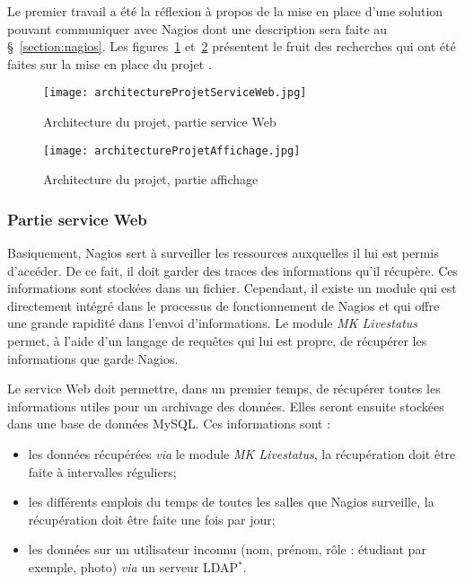 Le premier travail a \'et\'e la r\'eflexion \`a propos de la mise en place d'une solution pouvant communiquer avec Nagios dont une description sera faite au \S~\ref{section:nagios}.
Les figures~\ref{figure:architectureProjetServiceWeb} et~\ref{figure:architectureProjetAffichage} pr\'esentent le fruit des recherches qui ont \'et\'e faites sur la mise en place du projet \YuukouII.

\begin{figure}[!ht]
	\centering
	\texttt{[image: architectureProjetServiceWeb.jpg]}
	\caption{Architecture du projet, partie service Web}
	\label{figure:architectureProjetServiceWeb}

\end{figure}

\begin{figure}[!ht]
	\centering
	\texttt{[image: architectureProjetAffichage.jpg]}
	\caption{Architecture du projet, partie affichage}
	\label{figure:architectureProjetAffichage}

\end{figure}

\subsubsection{Partie service Web}

Basiquement, Nagios sert \`a surveiller les ressources auxquelles il lui est permis d'acc\'eder.
De ce fait, il doit garder des traces des informations qu'il r\'ecup\`ere.
Ces informations sont stock\'ees dans un fichier.
Cependant, il existe un module qui est directement int\'egr\'e dans le processus de fonctionnement de Nagios et qui offre une grande rapidit\'e dans l'envoi d'informations.
Le module \textit{MK Livestatus} permet, \`a l'aide d'un langage de requ\^etes qui lui est propre, de r\'ecup\'erer les informations que garde Nagios.

Le service Web doit permettre, dans un premier temps, de r\'ecup\'erer toutes les informations utiles pour un archivage des donn\'ees.
Elles seront ensuite stock\'ees dans une base de donn\'ees MySQL.
\noindent Ces informations sont :

\begin{itemize}
	\item les donn\'ees r\'ecup\'er\'ees \textit{via} le module \textit{MK Livestatus}, la r\'ecup\'eration doit \^etre faite \`a intervalles r\'eguliers;
	\item les diff\'erents emplois du temps de toutes les salles que Nagios surveille, la r\'ecup\'eration doit \^etre faite une fois par jour;
	\item les donn\'ees sur un utilisateur inconnu (nom, pr\'enom, r\^ole : \'etudiant par exemple, photo) \textit{via} un serveur LDAP$^*$.

\end{itemize}

